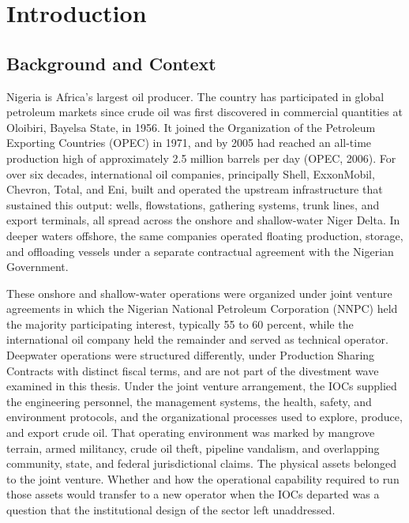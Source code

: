 \hypertarget{introduction}{%
\chapter{Introduction}\label{introduction}}

\hypertarget{background-and-context}{%
\section{Background and Context}\label{background-and-context}}

Nigeria is Africa's largest oil producer. The country has participated
in global petroleum markets since crude oil was first discovered in
commercial quantities at Oloibiri, Bayelsa State, in 1956. It joined the
Organization of the Petroleum Exporting Countries (OPEC) in 1971, and by
2005 had reached an all-time production high of approximately 2.5
million barrels per day (OPEC, 2006). For over six decades,
international oil companies, principally Shell, ExxonMobil, Chevron,
Total, and Eni, built and operated the upstream infrastructure that
sustained this output: wells, flowstations, gathering systems, trunk
lines, and export terminals, all spread across the onshore and
shallow-water Niger Delta. In deeper waters offshore, the same companies
operated floating production, storage, and offloading vessels under a
separate contractual agreement with the Nigerian Government.

These onshore and shallow-water operations were organized under joint
venture agreements in which the Nigerian National Petroleum Corporation
(NNPC) held the majority participating interest, typically 55 to 60
percent, while the international oil company held the remainder and
served as technical operator. Deepwater operations were structured
differently, under Production Sharing Contracts with distinct fiscal
terms, and are not part of the divestment wave examined in this thesis.
Under the joint venture arrangement, the IOCs supplied the engineering
personnel, the management systems, the health, safety, and environment
protocols, and the organizational processes used to explore, produce,
and export crude oil. That operating environment was marked by mangrove
terrain, armed militancy, crude oil theft, pipeline vandalism, and
overlapping community, state, and federal jurisdictional claims. The
physical assets belonged to the joint venture. Whether and how the
operational capability required to run those assets would transfer to a
new operator when the IOCs departed was a question that the
institutional design of the sector left unaddressed.

